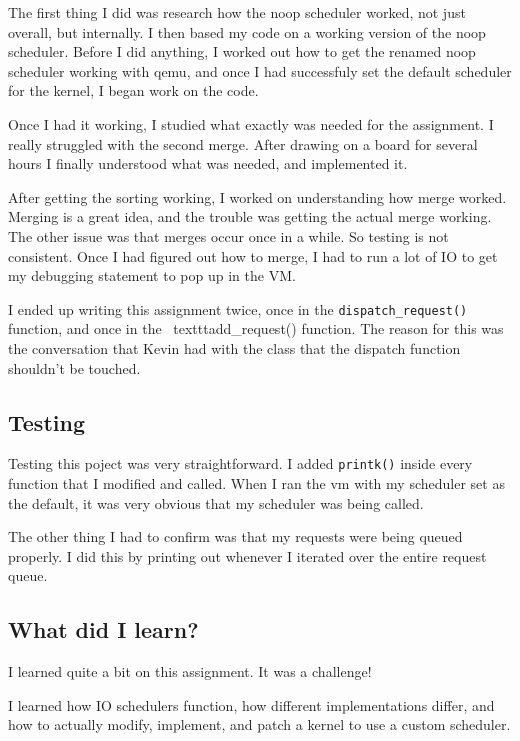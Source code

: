 \documentclass[10pt,letterpaper,onecolumn,draftclsnofoot]{IEEEtran}
\begin{document}
	The first thing I did was research how the noop scheduler worked, not just
	overall, but internally. I then based my code on a working version of the
	noop scheduler. Before I did anything, I worked out how to get the renamed
	noop scheduler working with qemu, and once I had successfuly set the default
	scheduler for the kernel, I began work on the code.

	Once I had it working, I studied what exactly was needed for the assignment.
	I really struggled with the second merge. After drawing on a board for several
  hours I finally understood what was needed, and implemented it.

	After getting the sorting working, I worked on understanding how merge worked.
	Merging is a great idea, and the trouble was getting the actual merge working.
	The other issue was that merges occur once in a while. So testing is not
	consistent. Once I had figured out how to merge, I had to run a lot of IO
	to get my debugging statement to pop up in the VM.

	I ended up writing this assignment twice, once in the
	\texttt{dispatch\_request()} function, and once in the \
	texttt{add\_request()} function. The reason for this was the conversation
	that Kevin had with the class that the dispatch function shouldn't be touched.

	\subsection{Testing}
	Testing this poject was very straightforward. I added \texttt{printk()} inside
	every function that I modified and called. When I ran the vm with my scheduler
	set as the default, it was very obvious that my scheduler was being called.

	The other thing I had to confirm was that my requests were being queued properly.
	I did this by printing out whenever I iterated over the entire request queue.

	\subsection{What did I learn?}
	I learned quite a bit on this assignment. It was a challenge!

	I learned how IO schedulers function, how different implementations differ,
	and how to actually modify, implement, and patch a kernel to use a custom
	scheduler.
\end{document}
